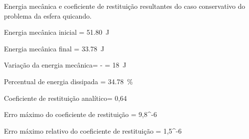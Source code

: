 \begin{table}[h]
\centering
\caption{Energia mecânica e coeficiente de restituição resultantes do caso conservativo do problema da esfera quicando.}
\label{tab:colliding_spheres:dissipative_rotation:energy_and_coefficient_of_restitution}
\begin{parametersdesc}
	\item{Energia mecânica inicial}{\initial{\mechanicalEnergy} = \SI{51,80}{\joule}}{}
	\item{Energia mecânica final}{\final{\mechanicalEnergy} = \SI{33,78}{\joule}}{}
	\item{Variação da energia mecânica}{\Delta \mechanicalEnergy = \initial{\mechanicalEnergy} - \final{\mechanicalEnergy} = \SI{18}{\joule}}{}
	\item{Percentual de energia dissipada}{\bigslant{\Delta\mechanicalEnergy}{\initial{\mechanicalEnergy}} = \SI{34,78}{\percent}}{}
	\item{Coeficiente de restituição analítico}{\coefficientOfRestitution = 0,64}{}
	\item{Erro máximo do coeficiente de restituição}{\maximumErrorOf{\coefficientOfRestitution} = 9,8^{-6}}{}
	\item{Erro máximo relativo do coeficiente de restituição}{\bigslant{\maximumErrorOf{\coefficientOfRestitution}}{\coefficientOfRestitution} = 1,5^{-6}}{}
\end{parametersdesc}
\sourceMe 
\end{table}


